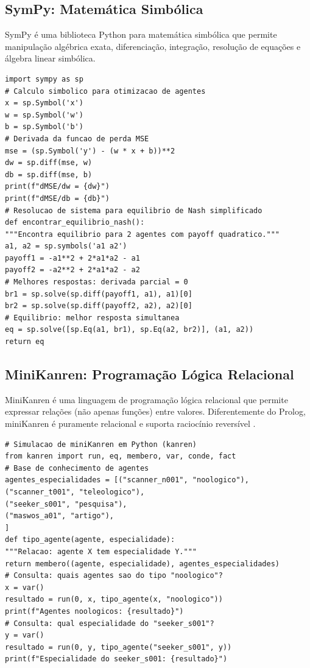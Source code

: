 \subsection{SymPy: Matemática Simbólica}
SymPy é uma biblioteca Python para matemática simbólica que permite
manipulação algébrica exata, diferenciação, integração, resolução de
equações e álgebra linear simbólica.
\begin{lstlisting}[style=pythonstyle]
import sympy as sp
# Calculo simbolico para otimizacao de agentes
x = sp.Symbol('x')
w = sp.Symbol('w')
b = sp.Symbol('b')
# Derivada da funcao de perda MSE
mse = (sp.Symbol('y') - (w * x + b))**2
dw = sp.diff(mse, w)
db = sp.diff(mse, b)
print(f"dMSE/dw = {dw}")
print(f"dMSE/db = {db}")
# Resolucao de sistema para equilibrio de Nash simplificado
def encontrar_equilibrio_nash():
"""Encontra equilibrio para 2 agentes com payoff quadratico."""
a1, a2 = sp.symbols('a1 a2')
payoff1 = -a1**2 + 2*a1*a2 - a1
payoff2 = -a2**2 + 2*a1*a2 - a2
# Melhores respostas: derivada parcial = 0
br1 = sp.solve(sp.diff(payoff1, a1), a1)[0]
br2 = sp.solve(sp.diff(payoff2, a2), a2)[0]
# Equilibrio: melhor resposta simultanea
eq = sp.solve([sp.Eq(a1, br1), sp.Eq(a2, br2)], (a1, a2))
return eq
\end{lstlisting}
\subsection{MiniKanren: Programação Lógica Relacional}
MiniKanren é uma linguagem de programação lógica relacional que permite
expressar relações (não apenas funções) entre valores. Diferentemente do
Prolog, miniKanren é puramente relacional e suporta raciocínio reversível
\cite{byrd2012mini}.
\begin{lstlisting}[style=pythonstyle]
# Simulacao de miniKanren em Python (kanren)
from kanren import run, eq, membero, var, conde, fact
# Base de conhecimento de agentes
agentes_especialidades = [("scanner_n001", "noologico"),
("scanner_t001", "teleologico"),
("seeker_s001", "pesquisa"),
("maswos_a01", "artigo"),
]
def tipo_agente(agente, especialidade):
"""Relacao: agente X tem especialidade Y."""
return membero((agente, especialidade), agentes_especialidades)
# Consulta: quais agentes sao do tipo "noologico"?
x = var()
resultado = run(0, x, tipo_agente(x, "noologico"))
print(f"Agentes noologicos: {resultado}")
# Consulta: qual especialidade do "seeker_s001"?
y = var()
resultado = run(0, y, tipo_agente("seeker_s001", y))
print(f"Especialidade do seeker_s001: {resultado}")
\end{lstlisting}
